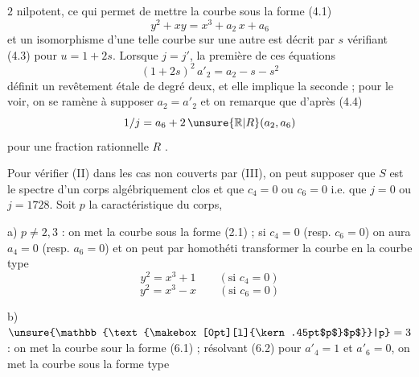 %
\space
$2$ nilpotent, ce qui permet de mettre la courbe sous la forme (4.1)
\[
y^2+xy=x^3+a_2\,x+a_6
\]
et un isomorphisme d'une telle courbe sur une autre est décrit par $s$ vérifiant (4.3) pour $u=1+2s$. Lorsque $j=j'$, la première de ces équations
\[
(1+2s)^2\,a'_2=a_2-s-s^2
\]
définit un revêtement étale de degré deux, et elle implique la seconde ; pour le voir, on se ramène à supposer $a_2=a'_2$ et on remarque que d'après (4.4)
\[
1/j=a_6+2\,\unsure{\mathbb{R}|R}(a_2,a_6)
\]
pour une fraction rationnelle $R$ .

Pour vérifier (II) dans les cas non couverts par (III), on peut supposer que $S$ est le spectre d'un corps algébriquement clos et que $c_4=0$ ou $c_6=0$ \unsure{,|;} i.e. que $j=0$ ou $j=1728$. Soit $p$ la caractéristique du corps,

a) $p\ne 2,3$ : on met la courbe sous la forme (2.1) ; si $c_4=0$ (resp. $c_6=0$) on aura $a_4=0$ (resp. $a_6=0$) et on peut par homothéti transformer la courbe en la courbe type
\[
y^2=x^3+1 \qquad (\text{si }c_4=0) \tag*{(6.5)}
\]
\[
y^2=x^3-x \qquad (\text{si }c_6=0) \tag*{(6.6)}
\]

b) $\unsure{\mathbb{\text{\makebox[0pt][l]{\kern.45pt$p$}$p$}}|p}=3$ : on met la courbe sour la forme (6.1) ; résolvant (6.2) pour $a'_4=1$ et $a'_6=0$, on met la courbe sous la forme type%
